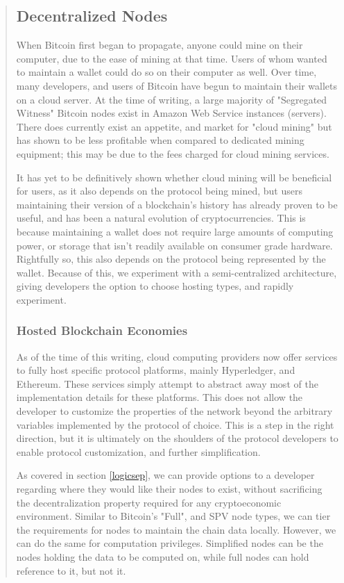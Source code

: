 \documentclass[12pt, titlepage, twocolumn]{report}
\begin{document}
\begin{quotation}
\subsection{Decentralized Nodes}
When Bitcoin first began to propagate, anyone could mine on their computer, due to the ease of mining at that time. Users of whom wanted to maintain a wallet could do so on their computer as well. Over time, many developers, and users of Bitcoin have begun to maintain their wallets on a cloud server. At the time of writing, a large majority of "Segregated Witness" Bitcoin nodes exist in Amazon Web Service instances (servers). There does currently exist an appetite, and market for "cloud mining" but has shown to be less profitable when compared to dedicated mining equipment; this may be due to the fees charged for cloud mining services.

It has yet to be definitively shown whether cloud mining will be beneficial for users, as it also depends on the protocol being mined, but users maintaining their version of a blockchain's history has already proven to be useful, and has been a natural evolution of cryptocurrencies. This is because maintaining a wallet does not require large amounts of computing power, or storage that isn't readily available on consumer grade hardware. Rightfully so, this also depends on the protocol being represented by the wallet. Because of this, we experiment with a semi-centralized architecture, giving developers the option to choose hosting types, and rapidly experiment.


\subsubsection{Hosted Blockchain Economies}
As of the time of this writing, cloud computing providers now offer services to fully host specific protocol platforms, mainly Hyperledger, and Ethereum. These services simply attempt to abstract away most of the implementation details for these platforms. This does not allow the developer to customize the properties of the network beyond the arbitrary variables implemented by the protocol of choice. This is a step in the right direction, but it is ultimately on the shoulders of the protocol developers to enable protocol customization, and further simplification.

As covered in section \ref{logicsep}, we can provide options to a developer regarding where they would like their nodes to exist, without sacrificing the decentralization property required for any cryptoeconomic environment. Similar to Bitcoin's "Full", and SPV node types, we can tier the requirements for nodes to maintain the chain data locally. However, we can do the same for computation privileges. Simplified nodes can be the nodes holding the data to be computed on, while full nodes can hold reference to it, but not it. 


\end{quotation}
\end{document}
